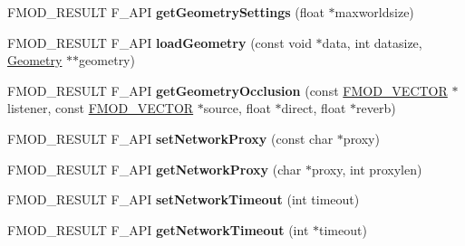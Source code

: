 \begin{DoxyCompactItemize}
\item 
\hypertarget{class_f_m_o_d_1_1_system_a4466ede69006041d702b6ac5be162c57}{F\+M\+O\+D\+\_\+\+R\+E\+S\+U\+L\+T F\+\_\+\+A\+P\+I {\bfseries get\+Geometry\+Settings} (float $\ast$maxworldsize)}\label{class_f_m_o_d_1_1_system_a4466ede69006041d702b6ac5be162c57}

\item 
\hypertarget{class_f_m_o_d_1_1_system_af9aa1402e3132a854037625ea6fabd4e}{F\+M\+O\+D\+\_\+\+R\+E\+S\+U\+L\+T F\+\_\+\+A\+P\+I {\bfseries load\+Geometry} (const void $\ast$data, int datasize, \hyperlink{class_f_m_o_d_1_1_geometry}{Geometry} $\ast$$\ast$geometry)}\label{class_f_m_o_d_1_1_system_af9aa1402e3132a854037625ea6fabd4e}

\item 
\hypertarget{class_f_m_o_d_1_1_system_ac1c462ead8eef9cbb955a898cd1c64a9}{F\+M\+O\+D\+\_\+\+R\+E\+S\+U\+L\+T F\+\_\+\+A\+P\+I {\bfseries get\+Geometry\+Occlusion} (const \hyperlink{struct_f_m_o_d___v_e_c_t_o_r}{F\+M\+O\+D\+\_\+\+V\+E\+C\+T\+O\+R} $\ast$listener, const \hyperlink{struct_f_m_o_d___v_e_c_t_o_r}{F\+M\+O\+D\+\_\+\+V\+E\+C\+T\+O\+R} $\ast$source, float $\ast$direct, float $\ast$reverb)}\label{class_f_m_o_d_1_1_system_ac1c462ead8eef9cbb955a898cd1c64a9}

\item 
\hypertarget{class_f_m_o_d_1_1_system_ab1368bd2bd2bcba58d4c70c385277bd1}{F\+M\+O\+D\+\_\+\+R\+E\+S\+U\+L\+T F\+\_\+\+A\+P\+I {\bfseries set\+Network\+Proxy} (const char $\ast$proxy)}\label{class_f_m_o_d_1_1_system_ab1368bd2bd2bcba58d4c70c385277bd1}

\item 
\hypertarget{class_f_m_o_d_1_1_system_a6346a910caaff928a7498f2bfeaf8a69}{F\+M\+O\+D\+\_\+\+R\+E\+S\+U\+L\+T F\+\_\+\+A\+P\+I {\bfseries get\+Network\+Proxy} (char $\ast$proxy, int proxylen)}\label{class_f_m_o_d_1_1_system_a6346a910caaff928a7498f2bfeaf8a69}

\item 
\hypertarget{class_f_m_o_d_1_1_system_aad7cb557e4992666cfc304dfbac6d04e}{F\+M\+O\+D\+\_\+\+R\+E\+S\+U\+L\+T F\+\_\+\+A\+P\+I {\bfseries set\+Network\+Timeout} (int timeout)}\label{class_f_m_o_d_1_1_system_aad7cb557e4992666cfc304dfbac6d04e}

\item 
\hypertarget{class_f_m_o_d_1_1_system_aaabd940cb1f8768ae35bf68782d72ab6}{F\+M\+O\+D\+\_\+\+R\+E\+S\+U\+L\+T F\+\_\+\+A\+P\+I {\bfseries get\+Network\+Timeout} (int $\ast$timeout)}\label{class_f_m_o_d_1_1_system_aaabd940cb1f8768ae35bf68782d72ab6}


\end{DoxyCompactItemize}
